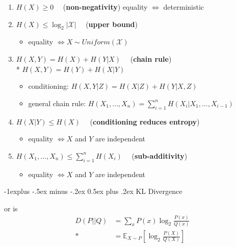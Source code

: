 \documentclass[10pt, landscape]{article}
\makeatletter
\renewcommand{\subsection}{\@startsection{subsection}{2}{0mm}%
  {-1explus -.5ex minus -.2ex}%
  {0.5ex plus .2ex}%
{\normalfont\normalsize\bfseries}}
\makeatother
\begin{document}
\begin{multicols*}{4}
  \begin{enumerate}
    \item $H(X) \geq 0 \quad$ (\textbf{non-negativity}) equality  $\Leftrightarrow$ deterministic
    \item $H(X) \leq \log_2 \vert\mathcal{X}\vert \quad$ (\textbf{upper bound}) 
      \begin{itemize}
        \item equality $\iff X\sim Uniform(\mathcal{X})$
      \end{itemize}
    \item $H(X, Y) = H(X) + H(Y\vert X) \quad$ (\textbf{chain rule})
      \\* $H(X, Y) = H(Y) + H(X\vert Y)$
      \begin{itemize}
        \item conditioning: $H(X, Y \vert Z) = H(X \vert Z) + H(Y \vert X, Z)$
        \item general chain rule: $H(X_1, \dots, X_n) = \sum^n_{i=1} H(X_i \vert X_1, \dots, X_{i-1})$
      \end{itemize}
    \item $H(X \vert Y) \leq H(X) \quad$ (\textbf{conditioning reduces entropy})
      \begin{itemize}
        \item equality $\iff X$ and $Y$ are independent
      \end{itemize}
    \item $H(X_1, \dots, X_n) \leq \sum^n_{i=1} H(X_i) \quad$ (\textbf{sub-additivity})
      \begin{itemize}
        \item equality $\iff X$ and $Y$ are independent
      \end{itemize}
  \end{enumerate}

  \subsection{KL Divergence}

  \begin{tightcenter}
     or  is
    \begin{align*}
      D(P||Q) &= \sum_x P(x) \log_2 \frac{P(x)}{Q(x)} \\*
              &= \mathbb{E}_{X \sim P}  \left[ \log_2 \frac{P(X)}{Q(X)} \right]
    \end{align*}
  \end{tightcenter}


\end{multicols*}
\end{document}
